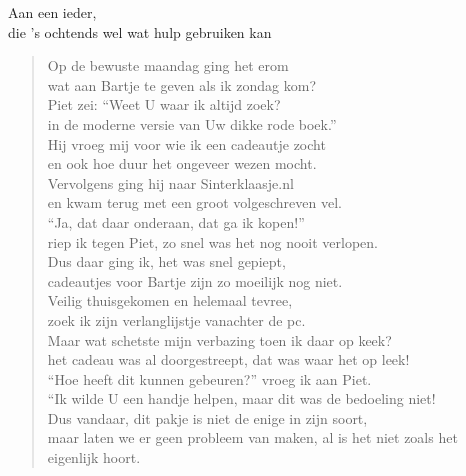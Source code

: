 \documentclass[12pt]{brief}
\date{4 december 2004}
\begin{document}
\begin{letter}{Aan een ieder,\\
die 's ochtends wel wat hulp gebruiken kan}

\opening{}


\begin{verse}

Op de bewuste maandag ging het erom\\
wat aan Bartje te geven als ik zondag kom?\\[0.5em]

Piet zei: ``Weet U waar ik altijd zoek?\\
in de moderne versie van Uw dikke rode boek.''\\[0.5em]

Hij vroeg mij voor wie ik een cadeautje zocht\\
en ook hoe duur het ongeveer wezen mocht.\\[0.5em]

Vervolgens ging hij naar Sinterklaasje.nl\\
en kwam terug met een groot volgeschreven vel.\\[0.5em]

``Ja, dat daar onderaan, dat ga ik kopen!''\\
riep ik tegen Piet, zo snel was het nog nooit verlopen.\\[2em]


Dus daar ging ik, het was snel gepiept,\\
cadeautjes voor Bartje zijn zo moeilijk nog niet.\\[0.5em]

Veilig thuisgekomen en helemaal tevree,\\
zoek ik zijn verlanglijstje vanachter de pc.\\[0.5em]

Maar wat schetste mijn verbazing toen ik daar op keek?\\
het cadeau was al doorgestreept, dat was waar het op leek!\\[0.5em]

``Hoe heeft dit kunnen gebeuren?'' vroeg ik aan Piet.\\
``Ik wilde U een handje helpen, maar dit was de bedoeling niet!\\[2em]


Dus vandaar, dit pakje is niet de enige in zijn soort,\\
maar laten we er geen probleem van maken, al is het niet zoals het eigenlijk hoort.\\[0.5em]


\end{verse}
\end{letter}
\end{document}
